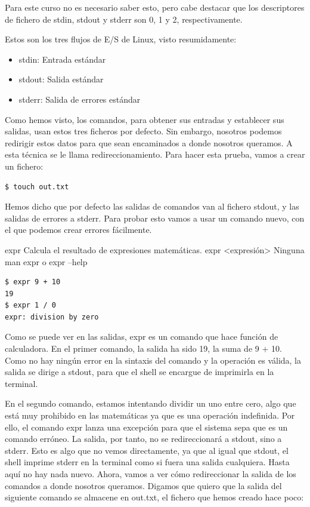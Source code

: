 Para este curso no es necesario saber esto, pero cabe destacar que los descriptores de fichero de stdin, stdout y stderr son 0, 1 y 2, respectivamente.

Estos son los tres flujos de E/S de Linux, visto resumidamente:

\begin{itemize}
    \item stdin: Entrada estándar
    \item stdout: Salida estándar
    \item stderr: Salida de errores estándar
\end{itemize}

Como hemos visto, los comandos, para obtener sus entradas y establecer sus salidas, usan estos tres ficheros por defecto. Sin embargo, nosotros podemos redirigir estos datos para que sean encaminados a donde nosotros queramos. A esta técnica se le llama redireccionamiento. Para hacer esta prueba, vamos a crear un fichero:

\begin{tcolorbox-code}
\begin{lstlisting}
$ touch out.txt
\end{lstlisting}
\end{tcolorbox-code}

Hemos dicho que por defecto las salidas de comandos van al fichero stdout, y las salidas de errores a stderr. Para probar esto vamos a usar un comando nuevo, con el que podemos crear errores fácilmente.

\begin{command-info}
{expr}
{Calcula el resultado de expresiones matemáticas.}
{expr <expresión>}
{Ninguna}
{man expr o expr --help}
\end{command-info}

\begin{tcolorbox-code}
\begin{lstlisting}
$ expr 9 + 10
19
$ expr 1 / 0
expr: division by zero
\end{lstlisting}
\end{tcolorbox-code}

Como se puede ver en las salidas, expr es un comando que hace función de calculadora. En el primer comando, la salida ha sido 19, la suma de 9 + 10. Como no hay ningún error en la sintaxis del comando y la operación es válida, la salida se dirige a stdout, para que el shell se encargue de imprimirla en la terminal.

En el segundo comando, estamos intentando dividir un uno entre cero, algo que está muy prohibido en las matemáticas ya que es una operación indefinida. Por ello, el comando expr lanza una excepción para que el sistema sepa que es un comando erróneo. La salida, por tanto, no se redireccionará a stdout, sino a stderr. Esto es algo que no vemos directamente, ya que al igual que stdout, el shell imprime stderr en la terminal como si fuera una salida cualquiera.
Hasta aquí no hay nada nuevo. Ahora, vamos a ver cómo redireccionar la salida de los comandos a donde nosotros queramos. Digamos que quiero que la salida del siguiente comando se almacene en out.txt, el fichero que hemos creado hace poco:

